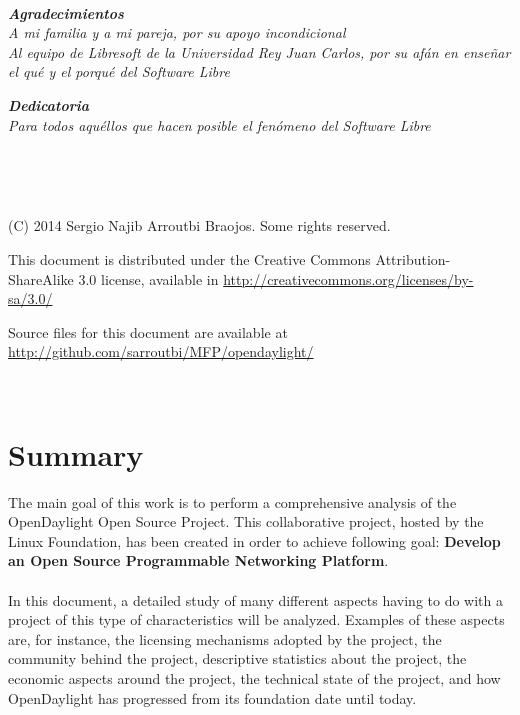 \documentclass[a4paper, 12pt]{book}
\begin{document}
\newpage
~
\thispagestyle{empty}
\vspace{3cm}
\begin{flushright}
\textbf{\textit{Agradecimientos}} \\
\textit{A mi familia y a mi pareja, por su apoyo incondicional\\
Al equipo de Libresoft de la Universidad Rey Juan Carlos,
por su afán en enseñar el qué y el porqué del Software Libre}
\vspace{2cm}

\textbf{\textit{Dedicatoria}} \\
\textit{Para todos aquéllos que hacen posible el fenómeno del Software Libre}
\end{flushright}

\newpage
~


\newpage
~
\thispagestyle{empty}
\vspace{12cm}
\begin{flushright}

(C) 2014 Sergio Najib Arroutbi Braojos. Some rights reserved.

This document is distributed under the Creative Commons
Attribution-ShareAlike 3.0 license,
available in \url{http://creativecommons.org/licenses/by-sa/3.0/}

Source files for this document are available at
\url{http://github.com/sarroutbi/MFP/opendaylight/}
\end{flushright}

\newpage
~

\tableofcontents

\listoffigures

\listoftables


\chapter*{Summary}
\label{chap:summary}

The main goal of this work is to perform a comprehensive analysis of the OpenDaylight Open Source Project. This collaborative project, hosted by the Linux Foundation, has been created in order to achieve following goal: \textbf{Develop an Open Source Programmable Networking Platform}.\\
\\
In this document, a detailed study of many different aspects having to do with a project of this type of characteristics will be analyzed. Examples of these aspects are, for instance, the licensing mechanisms adopted by the project, the community behind the project, descriptive statistics about the project, the economic aspects around the project, the technical state of the project, and how OpenDaylight has progressed from its foundation date until today.
\end{document}
